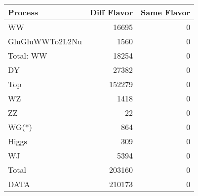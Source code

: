 \begin{table}[ht]
	\centering
\begin{tabular}{lrr}

         Process &  Diff Flavor &  Same Flavor \\
		\hline
              WW &        16695 &            0 \\
 GluGluWWTo2L2Nu &         1560 &            0 \\
\hline
       Total: WW &        18254 &            0 \\
              DY &        27382 &            0 \\
             Top &       152279 &            0 \\
              WZ &         1418 &            0 \\
              ZZ &           22 &            0 \\
           WG(*) &          864 &            0 \\
           Higgs &          309 &            0 \\
              WJ &         5394 &            0 \\
\hline
           Total &       203160 &            0 \\
            DATA &       210173 &            0 \\


\end{tabular}

\end{table}